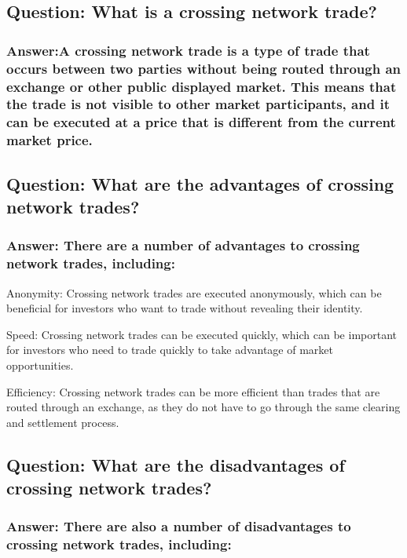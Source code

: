 \documentclass[11pt]{article}
\begin{document}
\subsection{Question: What is a crossing network trade?}
\label{sec:org83b1d12}
\subsubsection{Answer:A crossing network trade is a type of trade that occurs between two parties without being routed through an exchange or other public displayed market. This means that the trade is not visible to other market participants, and it can be executed at a price that is different from the current market price.}
\label{sec:orgcf55065}

\subsection{Question: What are the advantages of crossing network trades?}
\label{sec:orgd53a676}
\subsubsection{Answer: There are a number of advantages to crossing network trades, including:}
\label{sec:org3b4e960}

Anonymity: Crossing network trades are executed anonymously, which can be beneficial for investors who want to trade without revealing their identity.

Speed: Crossing network trades can be executed quickly, which can be important for investors who need to trade quickly to take advantage of market opportunities.

Efficiency: Crossing network trades can be more efficient than trades that are routed through an exchange, as they do not have to go through the same clearing and settlement process.

\subsection{Question: What are the disadvantages of crossing network trades?}
\label{sec:org7e8f90e}

\subsubsection{Answer: There are also a number of disadvantages to crossing network trades, including:}
\label{sec:org037ab29}
\end{document}
